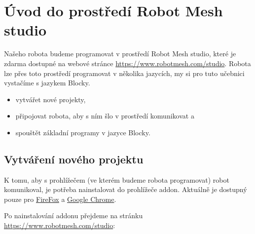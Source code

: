 \documentclass[main.tex]{subfiles}
\begin{document}
	\section{Úvod do prostředí Robot Mesh studio}

	Našeho robota budeme programovat v prostředí Robot Mesh studio, které je zdarma dostupné na webové stránce \href{https://www.robotmesh.com/studio}{https://www.robotmesh.com/studio}. Robota lze přes toto prostředí programovat v několika jazycích, my si pro tuto učebnici vystačíme s jazykem Blocky.

	\begin{sectionsummary}
		\begin{itemize}
			\item vytvářet nové projekty,
			\item připojovat robota, aby s ním šlo v prostředí komunikovat a
			\item spouštět základní programy v jazyce Blocky.
		\end{itemize}
	\end{sectionsummary}

	\subsection{Vytváření nového projektu}
	K tomu, aby s prohlížečem (ve kterém budeme robota programovat) robot komunikoval, je potřeba nainstalovat do prohlížeče addon. Aktuálně je dostupný pouze pro \href{https://addons.mozilla.org/en-US/firefox/addon/robot-mesh-connect/}{FireFox} a \href{https://chrome.google.com/webstore/detail/robot-mesh-connect-app/mapfkcmnklanficcnnjkgeneakedmjkp}{Google Chrome}.

	Po nainstalování addonu přejdeme na stránku \href{https://www.robotmesh.com/studio}{https://www.robotmesh.com/studio}:

	\begin{figure}[h!]
		\centering
	\end{figure}
\end{document}
